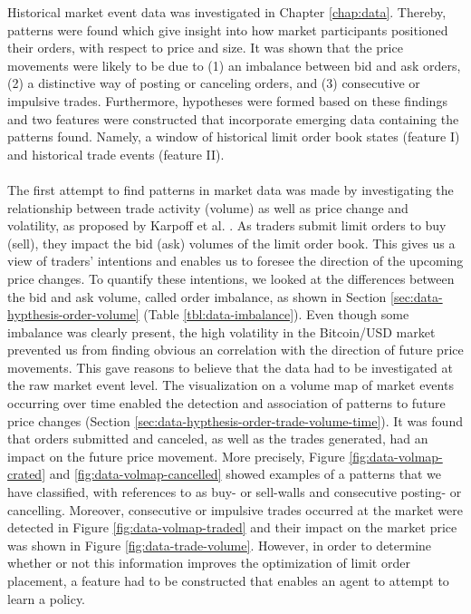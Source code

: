     Historical market event data was investigated in Chapter \ref{chap:data}. 
    Thereby, patterns were found which give insight into how market participants positioned their orders, with respect to price and size. 
    It was shown that the price movements were likely to be due to (1) an imbalance between bid and ask orders, (2) a distinctive way of posting or canceling orders, and (3) consecutive or impulsive trades.
    Furthermore, hypotheses were formed based on these findings and two features were constructed that incorporate emerging data containing the patterns found.
    Namely, a window of historical limit order book states (feature I) and historical trade events (feature II).
    \\
    \\
The first attempt to find patterns in market data was made by investigating the relationship between trade activity (volume) as well as price change and volatility, as proposed by Karpoff et al. \cite{karpoff1987relation}.  
As traders submit limit orders to buy (sell), they impact the bid (ask) volumes of the  limit order book. This gives us a view of traders’ intentions and enables us to foresee the direction of the upcoming price changes.
To quantify these intentions, we looked at the differences between the bid and ask volume, called order imbalance, as shown in Section \ref{sec:data-hypthesis-order-volume} (Table \ref{tbl:data-imbalance}).
Even though some imbalance was clearly present, the high volatility in the Bitcoin/USD market prevented us from finding obvious an correlation with the direction of future price movements.
This gave reasons to believe that the data had to be investigated at the raw market event level\cite{kane2011analyzing}.
The visualization on a volume map of market events occurring over time enabled the detection and association of patterns to future price changes (Section \ref{sec:data-hypthesis-order-trade-volume-time}).
It was found that orders submitted and canceled, as well as the trades generated, had an impact on the future price movement.
More precisely, Figure \ref{fig:data-volmap-crated} and \ref{fig:data-volmap-cancelled} showed examples of a patterns that we have classified, with references to \cite{schluetter2010system, biais1995empirical} as buy- or sell-walls and consecutive posting- or cancelling.
Moreover, consecutive or impulsive trades occurred at the market were detected in Figure \ref{fig:data-volmap-traded} and their impact on the market price was shown in Figure \ref{fig:data-trade-volume}.
However, in order to determine whether or not this information improves the optimization of limit order placement, a feature had to be constructed that enables an agent to attempt to learn a policy.
